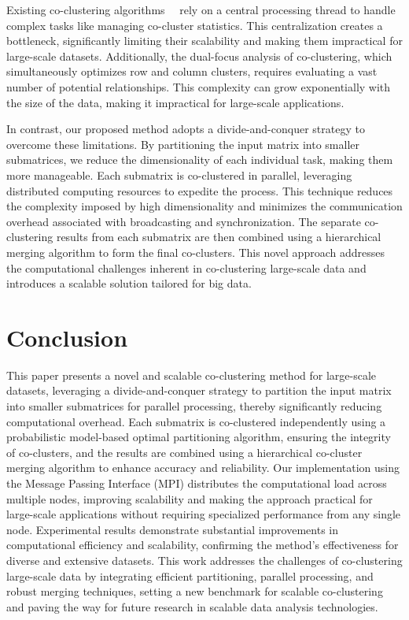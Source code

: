 \documentclass[journal]{IEEEtran}
\renewcommand{\cite}[1]{~\autocite{#1}}
\begin{document}
Existing co-clustering algorithms~\cite{chen2023ParallelNonNegativeMatrix, cheng2015CoClusterDDistributedFramework} rely on a central processing thread to handle complex tasks like managing co-cluster statistics. This centralization creates a bottleneck, significantly limiting their scalability and making them impractical for large-scale datasets. Additionally, the dual-focus analysis of co-clustering, which simultaneously optimizes row and column clusters, requires evaluating a vast number of potential relationships. This complexity can grow exponentially with the size of the data, making it impractical for large-scale applications.

In contrast, our proposed method adopts a divide-and-conquer strategy to overcome these limitations. By partitioning the input matrix into smaller submatrices, we reduce the dimensionality of each individual task, making them more manageable. Each submatrix is co-clustered in parallel, leveraging distributed computing resources to expedite the process. This technique reduces the complexity imposed by high dimensionality and minimizes the communication overhead associated with broadcasting and synchronization. The separate co-clustering results from each submatrix are then combined using a hierarchical merging algorithm to form the final co-clusters. This novel approach addresses the computational challenges inherent in co-clustering large-scale data and introduces a scalable solution tailored for big data.


\section{Conclusion}
\label{sec:conclusion}
This paper presents a novel and scalable co-clustering method for large-scale datasets, leveraging a divide-and-conquer strategy to partition the input matrix into smaller submatrices for parallel processing, thereby significantly reducing computational overhead. Each submatrix is co-clustered independently using a probabilistic model-based optimal partitioning algorithm, ensuring the integrity of co-clusters, and the results are combined using a hierarchical co-cluster merging algorithm to enhance accuracy and reliability. Our implementation using the Message Passing Interface (MPI) distributes the computational load across multiple nodes, improving scalability and making the approach practical for large-scale applications without requiring specialized performance from any single node. Experimental results demonstrate substantial improvements in computational efficiency and scalability, confirming the method's effectiveness for diverse and extensive datasets. This work addresses the challenges of co-clustering large-scale data by integrating efficient partitioning, parallel processing, and robust merging techniques, setting a new benchmark for scalable co-clustering and paving the way for future research in scalable data analysis technologies.
\end{document}
